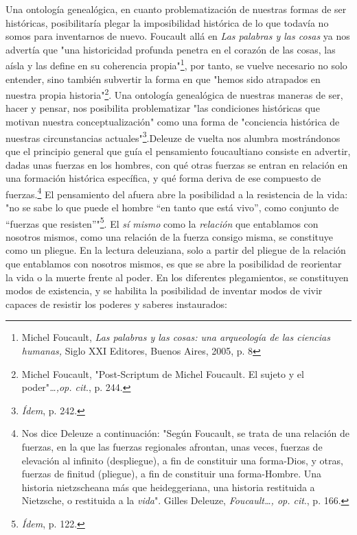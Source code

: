\documentclass{book}
\begin{document}
Una ontología genealógica, en cuanto problematización de nuestras formas
de ser históricas, posibilitaría plegar la imposibilidad histórica de lo
que todavía no somos para inventarnos de nuevo. Foucault allá en
\emph{Las palabras y las cosas} ya nos advertía que "una historicidad
profunda penetra en el corazón de las cosas, las aísla y las define en
su coherencia propia"\footnote{Michel Foucault, \emph{Las palabras y las
  cosas: una arqueología de las ciencias humanas,} Siglo XXI Editores,
  Buenos Aires, 2005, p. 8}, por tanto, se vuelve necesario no solo
entender, sino también subvertir la forma en que "hemos sido atrapados
en nuestra propia historia"\footnote{Michel Foucault, "Post-Scriptum de
  Michel Foucault. El sujeto y el poder"\emph{\ldots,op. cit}., p. 244.}.
Una ontología genealógica de nuestras maneras de ser, hacer y pensar,
nos posibilita problematizar "las condiciones históricas que motivan
nuestra conceptualización" como una forma de "conciencia histórica de
nuestras circunstancias actuales"\footnote{\emph{Ídem}, p. 242.}.Deleuze
de vuelta nos alumbra mostrándonos que el principio general que guía el
pensamiento foucaultiano consiste en advertir, dadas unas fuerzas en los
hombres, con qué otras fuerzas se entran en relación en una formación
histórica específica, y qué forma deriva de ese compuesto de
fuerzas.\footnote{Nos dice Deleuze a continuación: "Según Foucault, se
  trata de una relación de fuerzas, en la que las fuerzas regionales
  afrontan, unas veces, fuerzas de elevación al infinito (despliegue), a
  fin de constituir una forma-Dios, y otras, fuerzas de finitud
  (pliegue), a fin de constituir una forma-Hombre. Una historia
  nietzscheana más que heideggeriana, una historia restituida a
  Nietzsche, o restituida a la \emph{vida}". Gilles Deleuze,
  \emph{Foucault\ldots, op. cit}., p. 166.} El pensamiento del afuera
abre la posibilidad a la resistencia de la vida: "no se sabe lo que
puede el hombre ``en tanto que está vivo'', como conjunto de ``fuerzas
que resisten''"\footnote{\emph{Ídem}, p. 122.}. El \emph{sí mismo} como
la \emph{relación} que entablamos con nosotros mismos, como una relación
de la fuerza consigo misma, se constituye como un pliegue. En la lectura
deleuziana, solo a partir del pliegue de la relación que entablamos con
nosotros mismos, es que se abre la posibilidad de reorientar la vida o
la muerte frente al poder. En los diferentes plegamientos, se
constituyen modos de existencia, y se habilita la posibilidad de
inventar modos de vivir capaces de resistir los poderes y saberes
instaurados:
\end{document}
